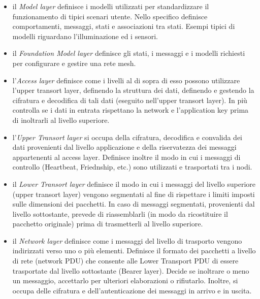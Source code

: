 \begin{itemize}
    \item il \textit{Model layer} definisce i modelli utilizzati per standardizzare il funzionamento di tipici scenari utente. Nello specifico definisce comportamenti, messaggi, stati e associazioni tra stati. Esempi tipici di modelli riguardano l'illuminazione ed i sensori.
    
    \item il \textit{Foundation Model layer} definisce gli stati, i messaggi e i modelli richiesti per configurare e gestire una rete mesh.
    
    \item l'\textit{Access layer} definisce come i livelli al di sopra di esso possono utilizzare l'upper transort layer, definendo la struttura dei dati, definendo e gestendo la cifratura e decodifica di tali dati (eseguito nell'upper transort layer). In più controlla se i dati in entrata rispettano la network e l'application key prima di inoltrarli al livello superiore.
    
    \item l'\textit{Upper Transort layer} si occupa della cifratura, decodifica e convalida dei dati provenienti dal livello applicazione e della riservatezza dei messaggi appartenenti al access layer. Definisce inoltre il modo in cui i messaggi di controllo (Heartbeat, Friednship, etc.) sono utilizzati e trasportati tra i nodi.
    
    \item il \textit{Lower Transort layer} definisce il modo in cui i messaggi del livello superiore (upper transort layer) vengono segmentati al fine di rispettare i limiti imposti sulle dimensioni dei pacchetti. In caso di messaggi segmentati, provenienti dal livello sottostante, prevede di riassemblarli (in modo da ricostituire il pacchetto originale) prima di trasmetterli al livello superiore.
    
    \item il \textit{Network layer} definisce come i messaggi del livello di trasporto vengono indirizzati verso uno o più elementi. Definisce il formato dei pacchetti a livello di rete (network PDU) che consente alle Lower Transport PDU di essere trasportate dal livello sottostante (Bearer layer). Decide se inoltrare o meno un messaggio, accettarlo per ulteriori elaborazioni o rifiutarlo. Inoltre, si occupa delle cifratura e dell'autenticazione dei messaggi in arrivo e in uscita.
    

\end{itemize}
